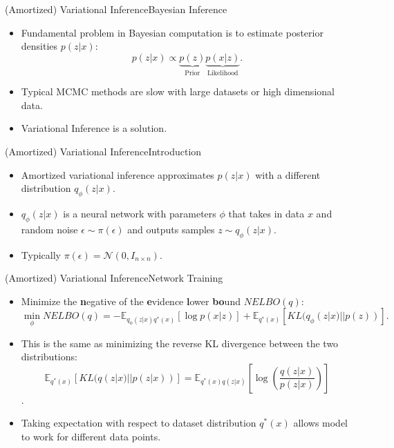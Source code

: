 \documentclass{beamer}
\newcommand{\E}{\mathbb{E}}
\begin{document}
\begin{frame}{(Amortized) Variational Inference}{Bayesian Inference}
  \begin{itemize}
  \item {
    Fundamental problem in Bayesian computation is to estimate posterior densities $p(z|x)$:
  }
  \begin{equation*}
p(z|x)\propto \underbrace{p(z)}_\text{Prior}\underbrace{p(x|z)}_\text{Likelihood}.
\end{equation*}
  \item {
    Typical MCMC methods are slow with large datasets or high dimensional data.
  }
  \item {
    Variational Inference is a solution.
  }
  \end{itemize}
\end{frame}
\begin{frame}{(Amortized) Variational Inference}{Introduction}
\begin{itemize}
\item Amortized variational inference approximates $p(z|x)$ with a different distribution $q_\phi(z|x)$.
\item $q_\phi(z|x)$ is a neural network with parameters $\phi$ that takes in data $x$ and random noise $\epsilon\sim \pi(\epsilon)$ and outputs samples $z\sim q_\phi(z|x)$.
\item Typically $\pi(\epsilon)=\mathcal{N}(0,I_{n\times n})$.
\begin{figure}[h]
  \centering
\end{figure}
\end{itemize}
\end{frame}
\begin{frame}{(Amortized) Variational Inference}{Network Training}
\begin{itemize}
\item Minimize the \textbf{n}egative of the \textbf{e}vidence \textbf{l}ower \textbf{bo}und $NELBO(q)$:
\[\min_\phi NELBO(q)=-\mathbb{E}_{q_\phi(z|x)q^*(x)}[\log p(x|z)]+\mathbb{E}_{q^*(x)}[KL(q_\phi(z|x)||p(z))].\]
\item This is the same as minimizing the reverse KL divergence between the two distributions:
\[\E_{q^*(x)}[KL(q(z|x)||p(z|x))]=\mathbb{E}_{q^*(x)q(z|x)}\left[\log \left(\frac{q(z|x)}{p(z|x)}\right)\right]\].
\item Taking expectation with respect to dataset distribution $q^*(x)$ allows model to work for different data points.
\end{itemize}
\end{frame}
\end{document}
